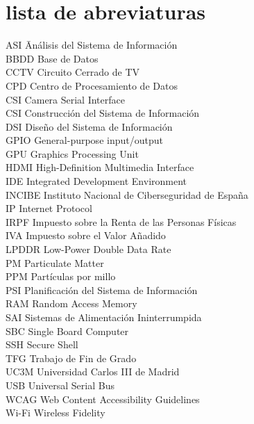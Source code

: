 \newpage %
\thispagestyle{empty}
\mbox{}

\chapter*{lista de abreviaturas}
\begin{tabbing}  %
	ASI \quad\quad\quad\= Análisis del Sistema de Información \\
	BBDD \> Base de Datos \\
	CCTV \> Circuito Cerrado de TV \\
	CPD \>  Centro de Procesamiento de Datos \\
	CSI \> Camera Serial Interface \\
	CSI \> Construcción del Sistema de Información \\
	DSI \> Diseño del Sistema de Información \\
	GPIO \> General-purpose input/output \\
	GPU \> Graphics Processing Unit \\
	HDMI \> High-Definition Multimedia Interface \\
	IDE \> Integrated Development Environment \\
	INCIBE \> Instituto Nacional de Ciberseguridad de España \\
	IP \> Internet Protocol \\
	IRPF \> Impuesto sobre la Renta de las Personas Físicas \\
	IVA \>  Impuesto sobre el Valor Añadido \\
	LPDDR \> Low-Power Double Data Rate \\
	PM \> Particulate Matter \\
	PPM \> Partículas por millo \\
	PSI \> Planificación del Sistema de Información \\
	RAM \> Random Access Memory \\
	SAI \> Sistemas de Alimentación Ininterrumpida \\
	SBC \> Single Board Computer \\
	SSH \> Secure Shell \\
	TFG \>  Trabajo de Fin de Grado \\
	UC3M  \>  Universidad Carlos III de Madrid \\
	USB \> Universal Serial Bus \\
	WCAG \> Web Content Accessibility Guidelines \\
	Wi-Fi \> Wireless Fidelity
\end{tabbing}